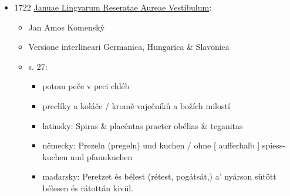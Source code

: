 \begin{itemize}
\begin{itemize}
    \begin{itemize}
    \tightlist
    \item
      Recept č. 37. Jinak: Jak připravit špízový koblih (Spiß-Krapffen)
    \item
      Zde se namísto předchozího těsta vezme dobré, sladké Linecké těsto
      (Linzer-Taig), které už bylo popsáno u mandlových dortů. Nemělo by
      však být příliš tučné. Vypracuj ho s jemným suchým kořením,
      vyválej na tloušťku prstu (a pokud je rožeň velký, nechej ho
      tlusté na šířku palce). Naviň ho na rožeň, svaž a upeč stejně jako
      v předchozím receptu. Pokud by začal hnědnout příliš brzy, musí se
      obalit papírem. Jakmile je hotový, hned se stáhne, postaví se
      vzpřímeně doprostřed mísy a nechá se vychladnout. Mezitím se z
      tohoto těsta upeče na plechu nebo papíře tenký plát (Schmarren),
      který se nakrájí na kousky také do velkého špízového koblihu
      (Spiß-Krapffen) udělej nahoru a dolů v dobrém rozestupu šikovné
      dírky, aby do nich zapadly špičky nakrájeného pečeného těsta
      (Schmarren). Poté si v pánvičce připrav hustý svařený cukr,
      pokaždé do něj namoč špičku jednoho kousku a takto střídavě jeden
      po druhém je upevňuj na ten koblih.
    \end{itemize}
  \end{itemize}
\item
  1722
  \href{https://ceskadigitalniknihovna.cz/uuid/uuid:53e484e8-3646-4b98-a954-6abfe5313ce0}{Januae
  Lingvarum Reseratae Aureae Vestibulum}:

  \begin{itemize}
  \tightlist
  \item
    Jan Amos Komenský
  \item
    Versione interlineari Germanica, Hungarica \& Slavonica
  \item
    s. 27:

    \begin{itemize}
    \tightlist
    \item
      potom peče v peci chléb
    \item
      preclíky a koláče / kromě vaječníků a božích milostí
    \item
      latinsky: Spiras \& placéntas praeter obélias \& teganitas
    \item
      německy: Prezeln (pregeln) und kuchen / ohne {[} aufferhalb {]}
      spiess-kuchen und pfaunkuchen
    \item
      maďarsky: Peretzet és bélest (rétest, pogátsát,) a' nyárson sütött
      bélesen és rátottán kivül.


\end{itemize}
\end{itemize}
\end{itemize}
